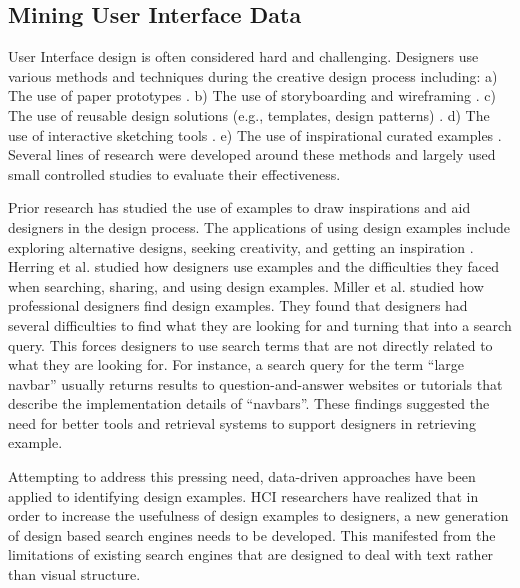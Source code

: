 \subsection{Mining User Interface Data}
User Interface design is often considered hard and challenging. Designers use various methods and techniques during the creative design process including: a) The use of paper prototypes \cite{newman_2000_DIS, klemmer_2001_UIST}. 
b) The use of storyboarding and wireframing \cite{newman_2000_DIS, wahid_2011_CHI}. 
c) The use of reusable design solutions (e.g., templates, design patterns) \cite{jacobs_2003_TOG, gibson_2005_WWW, ritchie_2011_CHI}.
d) The use of interactive sketching tools \cite{landay_1995_CHI, lin_2002_CHI, Newman_2003_HCI, sezgin_2006_GRAPH}.
e) The use of inspirational curated examples \cite{purcell_1992_KBS, herring_2009_CHI, lee_2010_CHI, ritchie_2011_CHI, miller_2014_ASME}.
Several lines of research were developed around these methods and largely used small controlled studies to evaluate their effectiveness.

Prior research has studied the use of examples to draw inspirations and aid designers in the design process.
The applications of using design examples include exploring alternative designs, seeking creativity, and getting an inspiration \cite{purcell_1992_KBS, herring_2009_CHI, lee_2010_CHI, ritchie_2011_CHI, chang_2012_CHI, miller_2014_ASME}.
Herring et al. \cite{herring_2009_CHI} studied how designers use examples and the difficulties they faced when searching, sharing, and using design examples.
Miller et al. \cite{miller_2014_ASME} studied how professional designers find design examples.
They found that designers had several difficulties to find what they are looking for and turning that into a search query.
This forces designers to use search terms that are not directly related to what they are looking for.
For instance, a search query for the term ``large navbar'' usually returns results to question-and-answer websites or tutorials that describe the implementation details of ``navbars''.
These findings suggested the need for better tools and retrieval systems to support designers in retrieving example.

Attempting to address this pressing need, data-driven approaches have been applied to identifying design examples.
HCI researchers have realized that in order to increase the usefulness of design examples to designers, a new generation of design based search engines needs to be developed.
This manifested from the limitations of existing search engines that are designed to deal with text rather than visual structure.

